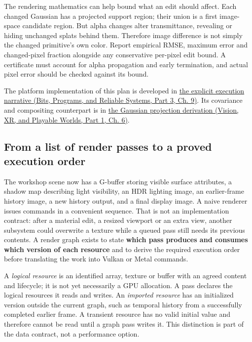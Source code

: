 The rendering mathematics can help bound what an edit should affect. Each changed Gaussian has a projected support region; their union is a first image-space candidate region. But alpha changes alter transmittance, revealing or hiding unchanged splats behind them. Therefore image difference is not simply the changed primitive's own color. Report empirical RMSE, maximum error and changed-pixel fraction alongside any conservative per-pixel edit bound. A certificate must account for alpha propagation and early termination, and actual pixel error should be checked against its bound.

The platform implementation of this plan is developed in \href{../01-Bits-Programs-and-Reliable-Systems-P03/main.pdf\#nameddest=01-foundations-i-ch011-give-one-image-an-explicit-path-through-the-machine}{the explicit execution narrative (Bits, Programs, and Reliable Systems, Part 3, Ch. 9)}. Its covariance and compositing counterpart is in \href{../07-Vision-XR-and-Playable-Worlds-P01/main.pdf\#nameddest=04-visual-computing-ii-ch037-local-projection-turns-an-ellipsoid-into-a-screen-ellipse}{the Gaussian projection derivation (Vision, XR, and Playable Worlds, Part 1, Ch. 6)}.

\subsection{From a list of render passes to a proved execution order}\label{06-engine-ii-ch042-from-a-list-of-render-passes-to-a-proved-execution-order}

\hypertarget{06-engine-ii-ch042-from-a-list-of-render-passes-to-a-proved-execution-order}{}

The workshop scene now has a G-buffer storing visible surface attributes, a shadow map describing light visibility, an HDR lighting image, an earlier-frame history image, a new history output, and a final display image. A naive renderer issues commands in a convenient sequence. That is not an implementation contract: after a material edit, a resized viewport or an extra view, another subsystem could overwrite a texture while a queued pass still needs its previous contents. A render graph exists to state \textbf{which pass produces and consumes which version of each resource} and to derive the required execution order before translating the work into Vulkan or Metal commands.

A \emph{logical resource} is an identified array, texture or buffer with an agreed content and lifecycle; it is not yet necessarily a GPU allocation. A pass declares the logical resources it reads and writes. An \emph{imported resource} has an initialized version outside the current graph, such as temporal history from a successfully completed earlier frame. A transient resource has no valid initial value and therefore cannot be read until a graph pass writes it. This distinction is part of the data contract, not a performance option.

